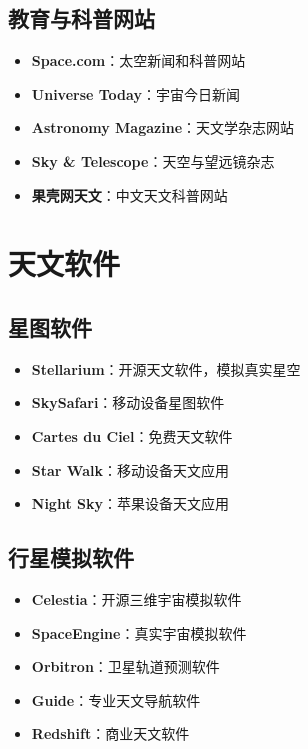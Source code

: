 \documentclass[12pt,UTF8]{ctexbook}
\begin{document}
\section{教育与科普网站}

\begin{itemize}
  \item \textbf{Space.com}：太空新闻和科普网站
  \item \textbf{Universe Today}：宇宙今日新闻
  \item \textbf{Astronomy Magazine}：天文学杂志网站
  \item \textbf{Sky & Telescope}：天空与望远镜杂志
  \item \textbf{果壳网天文}：中文天文科普网站
\end{itemize}

\chapter{天文软件}
\section{星图软件}

\begin{itemize}
  \item \textbf{Stellarium}：开源天文软件，模拟真实星空
  \item \textbf{SkySafari}：移动设备星图软件
  \item \textbf{Cartes du Ciel}：免费天文软件
  \item \textbf{Star Walk}：移动设备天文应用
  \item \textbf{Night Sky}：苹果设备天文应用
\end{itemize}

\section{行星模拟软件}

\begin{itemize}
  \item \textbf{Celestia}：开源三维宇宙模拟软件
  \item \textbf{SpaceEngine}：真实宇宙模拟软件
  \item \textbf{Orbitron}：卫星轨道预测软件
  \item \textbf{Guide}：专业天文导航软件
  \item \textbf{Redshift}：商业天文软件
\end{itemize}
\end{document}
